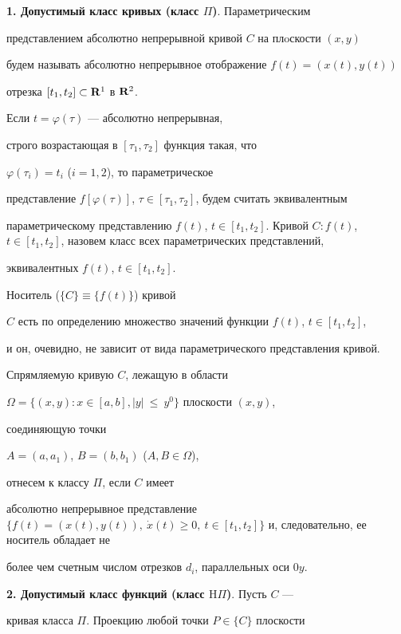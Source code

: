 {\bf 1. Допустимый класс кривых (класс $\Pi$)}. Параметрическим


представлением абсолютно непрерывной кривой $C$ на плoскости $(x,y)$


будем называть абсолютно непрерывное отображение $f(t)=(x(t),y(t))$


отрезка $[t_1,t_2] \subset {\bold R}^1$ в $ {\bold R}^2$.


Если $t=\varphi(\tau)$ --- абсолютно непрерывная,


строго возрастающая в $[\tau_1,\tau_2]$ функция такая, что


$\varphi(\tau_i)=t_i$ ($i=1,2$), то параметрическое


представление $f[\varphi(\tau)]$, $\tau\in


[\tau_1,\tau_2]$, будем считать эквивалентным


параметрическому представлению $f(t)$, $t\in[t_1,t_2]$. Кривой $C:


f(t)$, $t\in[t_1,t_2]$, назовем класс всех параметрических представлений,


эквивалентных $f(t)$, $t\in[t_1,t_2]$.


Носитель ($\{C\}\equiv\{f(t)\}$) кривой


$C$ есть по определению множество значений функции $f(t)$, $t\in[t_1,t_2]$,


и он, очевидно, не зависит от вида параметрического представления кривой.





Спрямляемую кривую $C$, лежащую в области


$\Omega=\{(x,y):x\in[a,b],|y|~\leq~ y^0\}$ плоскости $(x,y)$,


соединяющую точки


$A=(a,a_1)$, $B=(b,b_1)$ ($A,B\in \Omega$),


отнесем к классу $\Pi$, если $C$ имеет


абсолютно непрерывное представление $\{f(t)=(x(t),y(t)),\


\Dot{x}(t)\geq0,\ t\in[t_1,t_2]\}$ и, следовательно, ее носитель обладает не


более чем счетным числом отрезков $d_i$, параллельных оси $0y$.





{\bf 2. Допустимый класс функций (класс $\mathrm H\Pi$)}. Пусть $C$ ---


кривая класса $\Pi$. Проекцию любой точки $P\in\{C\}$ плоскости


